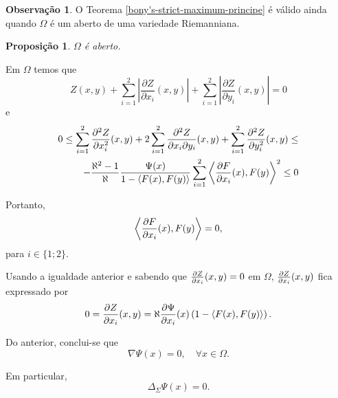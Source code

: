 \documentclass[12pt,a4paper]{beamer}
\newtheorem{proposicao}{Proposição}
\theoremstyle{definition}
\newtheorem{observacao}{Observação}
\begin{document}
\begin{frame}
	\begin{observacao}
		O Teorema \ref{bony's-strict-maximum-principe} é válido ainda quando $\Omega$ é um aberto de uma variedade Riemanniana. 
	\end{observacao}

		\begin{proposicao}
		$\Omega$ é aberto.
	\end{proposicao}
\end{frame}

\begin{frame}
	Em $\Omega$ temos que
	\begin{equation*}
		Z(x,y) + \sum_{i=1}^{2} \left| \frac{\partial Z}{\partial x_i}(x,y) \right| + \sum_{i=1}^{2} \left| \frac{\partial Z}{\partial y_i}(x,y) \right| = 0
	\end{equation*}
	e
	\begin{align*}
		0 \leq \sum_{i=1}^{2} \frac{\partial^2 Z}{\partial x_i^2}(x,y) + 2 \sum_{i=1}^{2} \frac{\partial^2 Z}{\partial x_i \partial y_i}(x,y) + \sum_{i=1}^{2} \frac{\partial^2 Z}{\partial y_i^2}(x,y) \leq \\
		- \frac{\aleph^2 -1}{\aleph} \frac{\Psi(x)}{1 - \left\langle F(x),F(y) \right\rangle} \sum_{i=1}^{2} \left\langle \frac{\partial F}{\partial x_i}(x),F(y) \right\rangle^2 \leq 0
	\end{align*}
\end{frame}

\begin{frame}
	Portanto, 
	\begin{equation*}
		\left\langle \frac{\partial F}{\partial x_i}(x),F(y) \right\rangle = 0,
	\end{equation*}
	para $i \in \{1;2\}$.
	
	Usando a igualdade anterior e sabendo que $\frac{\partial Z}{\partial x_i}(x,y)=0$ em $\Omega$, $\frac{\partial Z}{\partial x_i}(x,y)$ fica expressado por
	\begin{equation*}
		0 = \frac{\partial Z}{\partial x_i}(x,y) = \aleph \frac{\partial \Psi}{\partial x_i}(x) \left( 1 - \left\langle F(x),F(y) \right\rangle \right).
	\end{equation*}
\end{frame}

\begin{frame}
	Do anterior, conclui-se que
	\begin{equation*}
		\nabla \Psi(x) = 0, \quad \forall x \in \Omega.
	\end{equation*}
	
	Em particular,
	\begin{equation*}
		\Delta_{\Sigma} \Psi(x) = 0.
	\end{equation*}
\end{frame}
\end{document}
